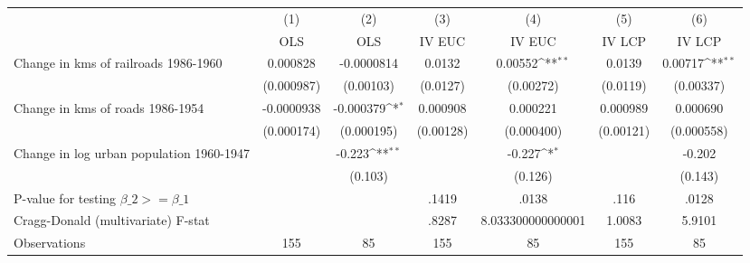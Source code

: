 {
\def\sym#1{\ifmmode^{#1}\else\(^{#1}\)\fi}
\begin{tabular}{l*{6}{c}}
\hline\hline
                &\multicolumn{1}{c}{(1)}&\multicolumn{1}{c}{(2)}&\multicolumn{1}{c}{(3)}&\multicolumn{1}{c}{(4)}&\multicolumn{1}{c}{(5)}&\multicolumn{1}{c}{(6)}\\
                &\multicolumn{1}{c}{OLS}&\multicolumn{1}{c}{OLS}&\multicolumn{1}{c}{IV EUC}&\multicolumn{1}{c}{IV EUC}&\multicolumn{1}{c}{IV LCP}&\multicolumn{1}{c}{IV LCP}\\
\hline
Change in kms of railroads 1986-1960& 0.000828         &-0.0000814         &   0.0132         &  0.00552\sym{**} &   0.0139         &  0.00717\sym{**} \\
                &(0.000987)         &(0.00103)         & (0.0127)         &(0.00272)         & (0.0119)         &(0.00337)         \\
[1em]
Change in kms of roads 1986-1954&-0.0000938         &-0.000379\sym{*}  & 0.000908         & 0.000221         & 0.000989         & 0.000690         \\
                &(0.000174)         &(0.000195)         &(0.00128)         &(0.000400)         &(0.00121)         &(0.000558)         \\
[1em]
Change in log urban population 1960-1947&                  &   -0.223\sym{**} &                  &   -0.227\sym{*}  &                  &   -0.202         \\
                &                  &  (0.103)         &                  &  (0.126)         &                  &  (0.143)         \\
\hline
P-value for testing $\beta\_{2} >= \beta\_{1}$&                  &                  &    .1419         &    .0138         &     .116         &    .0128         \\
Cragg-Donald (multivariate) F-stat&                  &                  &    .8287         &8.033300000000001         &   1.0083         &   5.9101         \\
Observations    &      155         &       85         &      155         &       85         &      155         &       85         \\
\hline\hline
\end{tabular}
}
